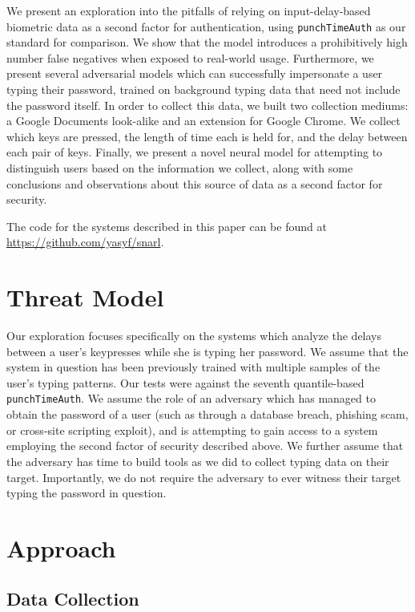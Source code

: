 \documentclass[9pt,journal]{IEEEtran}
\begin{document}
We present an exploration into the pitfalls of relying on input-delay-based biometric data as a second factor for authentication, using \texttt{punchTimeAuth} as our standard for comparison. We show that the model introduces a prohibitively high number false negatives when exposed to real-world usage. Furthermore, we present several adversarial models which can successfully impersonate a user typing their password, trained on background typing data that need not include the password itself. In order to collect this data, we built two collection mediums: a Google Documents look-alike and an extension for Google Chrome. We collect which keys are pressed, the length of time each is held for, and the delay between each pair of keys. Finally, we present a novel neural model for attempting to distinguish users based on the information we collect, along with some conclusions and observations about this source of data as a second factor for security.

The code for the systems described in this paper can be found at \url{https://github.com/yasyf/snarl}.

\section{Threat Model}

Our exploration focuses specifically on the systems which analyze the delays between a user's keypresses while she is typing her password. We assume that the system in question has been previously trained with multiple samples of the user's typing patterns. Our tests were against the seventh quantile-based \texttt{punchTimeAuth}. We assume the role of an adversary which has managed to obtain the password of a user (such as through a database breach, phishing scam, or cross-site scripting exploit), and is attempting to gain access to a system employing the second factor of security described above. We further assume that the adversary has time to build tools as we did to collect typing data on their target. Importantly, we do not require the adversary to ever witness their target typing the password in question.

\section{Approach}
\subsection{Data Collection}
\end{document}
